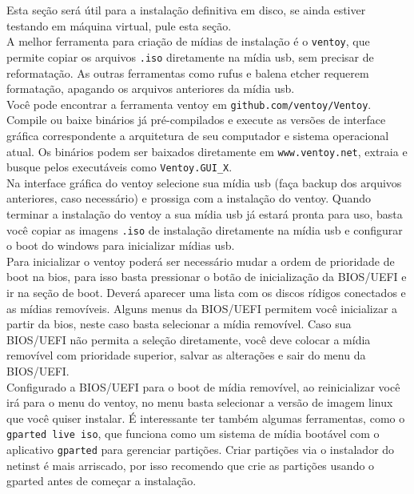 \documentclass[12pt,a4paper]{article}
\begin{document}
\vspace{\baselineskip}

Esta seção será útil para a instalação definitiva em disco, se ainda estiver testando em máquina virtual, pule esta seção. \\

A melhor ferramenta para criação de mídias de instalação é o \texttt{ventoy}, que permite copiar os arquivos \texttt{.iso} diretamente na mídia usb, sem precisar de reformatação. As outras ferramentas como rufus e balena etcher requerem formatação, apagando os arquivos anteriores da mídia usb.\\

Você pode encontrar a ferramenta ventoy em \texttt{github.com/ventoy/Ventoy}. Compile ou baixe binários já pré-compilados e execute as versões de interface gráfica correspondente a arquitetura de seu computador e sistema operacional atual. Os binários podem ser baixados diretamente em \texttt{www.ventoy.net}, extraia e busque pelos executáveis como \texttt{Ventoy.GUI\_X}. \\

Na interface gráfica do ventoy selecione sua mídia usb (faça backup dos arquivos anteriores, caso necessário) e prossiga com a instalação do ventoy. Quando terminar a instalação do ventoy a sua mídia usb já estará pronta para uso, basta você copiar as imagens \texttt{.iso} de instalação diretamente na mídia usb e configurar o boot do windows para inicializar mídias usb.\\

Para inicializar o ventoy poderá ser necessário mudar a ordem de prioridade de boot na bios, para isso basta pressionar o botão de inicialização da BIOS/UEFI e ir na seção de boot. Deverá aparecer uma lista com os discos rídigos conectados e as mídias removíveis. Alguns menus da BIOS/UEFI permitem você inicializar a partir da bios, neste caso basta selecionar a mídia removível. Caso sua BIOS/UEFI não permita a seleção diretamente, você deve colocar a mídia removível com prioridade superior, salvar as alterações e sair do menu da BIOS/UEFI.\\

Configurado a BIOS/UEFI para o boot de mídia removível, ao reinicializar você irá para o menu do ventoy, no menu basta selecionar a versão de imagem linux que você quiser instalar. É interessante ter também algumas ferramentas, como o \texttt{gparted live iso}, que funciona como um sistema de mídia bootável com o aplicativo \texttt{gparted} para gerenciar partições. Criar partições via o instalador do netinst é mais arriscado, por isso recomendo que crie as partições usando o gparted antes de começar a instalação.
\end{document}
